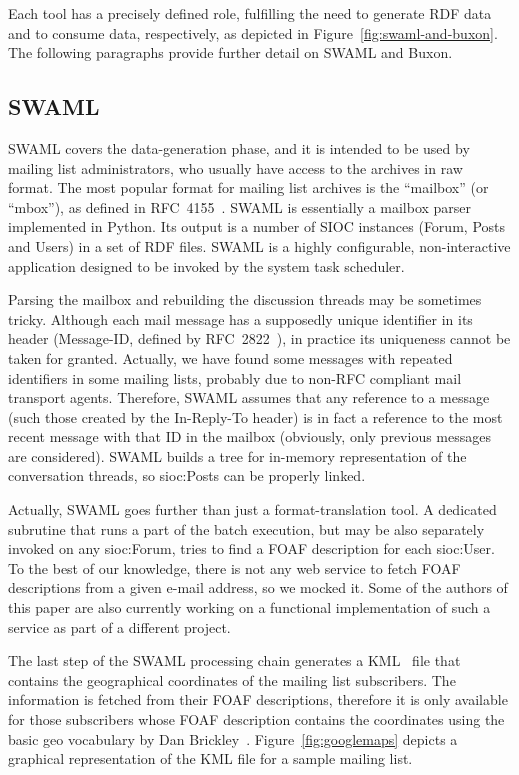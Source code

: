 \documentclass{llncs}
\begin{document}
Each tool has a precisely defined role, fulfilling the need to
generate RDF data and to consume data, respectively, as depicted
in Figure~\ref{fig:swaml-and-buxon}. The following paragraphs
provide further detail on SWAML and Buxon.

\subsection{SWAML}

SWAML covers the data-generation phase, and it is intended to be
used by mailing list administrators, who usually have access to
the archives in raw format. The most popular format for
mailing list archives is the ``mailbox'' (or ``mbox''), as defined
in RFC~4155~\cite{RFC4155}. SWAML is essentially a mailbox parser
implemented in Python. Its output is a number of SIOC instances
(\textsf{Forum}, \textsf{Post}s and \textsf{User}s) in a set
of RDF files. SWAML is a highly configurable, non-interactive
application designed to be invoked by the system task scheduler.

Parsing the mailbox and rebuilding the discussion threads may be
sometimes tricky. Although each mail message has a supposedly unique
identifier in its header (\textsf{Message-ID}, defined by
RFC~2822~\cite{RFC2822}), in practice its uniqueness cannot be
taken for granted. Actually, we have found some
messages with repeated identifiers in some mailing lists,
probably due to non-RFC compliant mail transport agents.
Therefore, SWAML assumes that any reference to a message
(such those created by the \textsf{In-Reply-To} header)
is in fact a reference to the most recent message with that ID
in the mailbox (obviously, only previous messages are
considered). SWAML builds a tree for in-memory representation
of the conversation threads, so \textsf{sioc:Post}s can be
properly linked.

Actually, SWAML goes further than just a format-translation
tool. A dedicated subrutine that runs a part of the batch
execution, but may be also separately invoked on any
\textsf{sioc:Forum}, tries to find a FOAF description for
each \textsf{sioc:User}. To the best of our knowledge, there is not
any web service to fetch FOAF descriptions from a given e-mail
address, so we mocked it. Some of the authors of this paper are also
currently working
on a functional implementation of such a service as part of a
different project.

The last step of the SWAML processing chain generates a
KML~\cite{Ricket2006} file that contains the geographical coordinates of
the mailing list subscribers. The information is fetched from their
FOAF descriptions, therefore it is only available for those
subscribers whose FOAF description contains the coordinates
using the basic \textsf{geo} vocabulary by Dan
Brickley~\cite{Brickley2006}.
Figure~\ref{fig:googlemaps} depicts a graphical representation
of the KML file for a sample mailing list.
\end{document}
